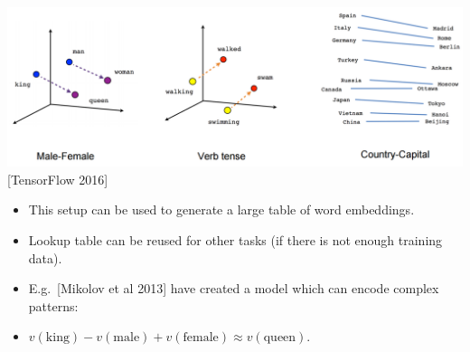 \documentclass[11pt, a4paper, landscape]{article}
\begin{document}
\begin{center}
  \includegraphics[width=.8\textwidth]{../article/img/linear-relationships}\\
  {[}TensorFlow 2016{]}
\end{center}

\vfill
\begin{itemize}
\item This setup can be used to generate a large table of word embeddings.
\item Lookup table can be reused for other tasks (if there is not enough training data).
\item E.g.\ [Mikolov et al 2013] have created a model which can encode complex patterns:
\item ${\displaystyle v(\mathrm {king} )-v(\mathrm {male} )+v(\mathrm {female} )\approx v(\mathrm {queen} )}$.
\end{itemize}
\vfill



%
\end{document}
